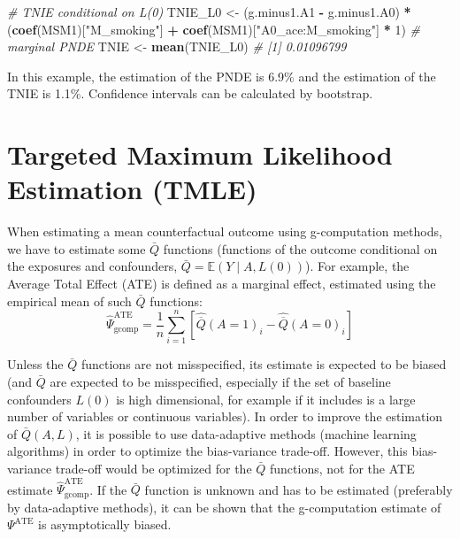 \documentclass[
]{book}
\newenvironment{Shaded}{\begin{snugshade}}{\end{snugshade}}
\newcommand{\CommentTok}[1]{\textcolor[rgb]{0.56,0.35,0.01}{\textit{#1}}}
\newcommand{\DecValTok}[1]{\textcolor[rgb]{0.00,0.00,0.81}{#1}}
\newcommand{\FunctionTok}[1]{\textcolor[rgb]{0.13,0.29,0.53}{\textbf{#1}}}
\newcommand{\NormalTok}[1]{#1}
\newcommand{\OtherTok}[1]{\textcolor[rgb]{0.56,0.35,0.01}{#1}}
\newcommand{\SpecialCharTok}[1]{\textcolor[rgb]{0.81,0.36,0.00}{\textbf{#1}}}
\newcommand{\StringTok}[1]{\textcolor[rgb]{0.31,0.60,0.02}{#1}}
\begin{document}
\begin{Shaded}
\begin{Highlighting}[]
\CommentTok{\# TNIE conditional on L(0)}
\NormalTok{TNIE\_L0 }\OtherTok{\textless{}{-}}\NormalTok{ (g.minus1.A1 }\SpecialCharTok{{-}}\NormalTok{ g.minus1.A0) }\SpecialCharTok{*}\NormalTok{ (}\FunctionTok{coef}\NormalTok{(MSM1)[}\StringTok{"M\_smoking"}\NormalTok{] }\SpecialCharTok{+}
                                            \FunctionTok{coef}\NormalTok{(MSM1)[}\StringTok{"A0\_ace:M\_smoking"}\NormalTok{] }\SpecialCharTok{*} \DecValTok{1}\NormalTok{)}
\CommentTok{\# marginal PNDE}
\NormalTok{TNIE }\OtherTok{\textless{}{-}} \FunctionTok{mean}\NormalTok{(TNIE\_L0)}
\CommentTok{\# [1] 0.01096799}
\end{Highlighting}
\end{Shaded}

In this example, the estimation of the PNDE is 6.9\% and the estimation of the TNIE is 1.1\%. Confidence intervals can be calculated by bootstrap.

\chapter{Targeted Maximum Likelihood Estimation (TMLE)}\label{chap_tmle}

When estimating a mean counterfactual outcome using g-computation methods, we have to estimate some \(\bar{Q}\) functions (functions of the outcome conditional on the exposures and confounders, \(\bar{Q}=\mathbb{E}\left(Y\mid A,L(0)\right)\)). For example, the Average Total Effect (ATE) is defined as a marginal effect, estimated using the empirical mean of such \(\bar{Q}\) functions:
\begin{equation*}
\hat{\Psi}^{\text{ATE}}_{\text{gcomp}} = \frac{1}{n} \sum_{i=1}^n \left[ \hat{\overline{Q}}(A=1)_i - \hat{\overline{Q}}(A=0)_i \right]
\end{equation*}

Unless the \(\bar{Q}\) functions are not misspecified, its estimate is expected to be biased (and \(\bar{Q}\) are expected to be misspecified, especially if the set of baseline confounders \(L(0)\) is high dimensional, for example if it includes is a large number of variables or continuous variables). In order to improve the estimation of \(\bar{Q}(A,L)\), it is possible to use data-adaptive methods (machine learning algorithms) in order to optimize the bias-variance trade-off. However, this bias-variance trade-off would be optimized for the \(\bar{Q}\) functions, not for the ATE estimate \(\hat{\Psi}^\text{ATE}_\text{gcomp}\). If the \(\bar{Q}\) function is unknown and has to be estimated (preferably by data-adaptive methods), it can be shown that the g-computation estimate of \(\Psi^\text{ATE}\) is asymptotically biased.
\end{document}
